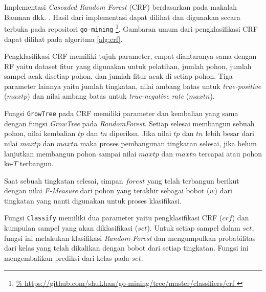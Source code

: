 Implementasi \textit{Cascaded Random Forest} (CRF) berdasarkan pada makalah
Bauman dkk.  \cite{baumann2013cascaded}.
Hasil dari implementasi dapat dilihat dan digunakan secara terbuka pada
repositori \texttt{go-mining}
\footnote{
\url{%
https://github.com/shuLhan/go-mining/tree/master/classifiers/crf
}}.
Gambaran umum dari pengklasifikasi CRF dapat dilihat pada algoritma
\ref{alg:crf}.

Pengklasifikasi CRF memiliki tujuh parameter, empat diantaranya sama dengan RF
yaitu dataset fitur yang digunakan untuk pelatihan, jumlah pohon, jumlah sampel
acak disetiap pohon, dan jumlah fitur acak di setiap pohon.
Tiga parameter lainnya yaitu jumlah tingkatan, nilai ambang batas untuk
\textit{true-positive} ($maxtp$) dan nilai ambang batas untuk
\textit{true-negative rate} ($maxtn$).

	\newpage
	

Fungsi \texttt{GrowTree} pada CRF memiliki parameter dan kembalian yang sama
dengan fungsi \textit{GrowTree} pada \textit{RandomForest}.
Setiap selesai membangun sebuah pohon, nilai kembalian $tp$ dan $tn$ diperiksa.
Jika nilai $tp$ dan $tn$ lebih besar dari nilai $maxtp$ dan $maxtn$ maka proses
pembangunan tingkatan selesai, jika belum lanjutkan membangun pohon sampai
nilai $maxtp$ dan $maxtn$ tercapai atau pohon ke-$T$ terbangun.

Saat sebuah tingkatan selesai, simpan $forest$ yang telah terbangun berikut
dengan nilai \textit{F-Measure} dari pohon yang terakhir sebagai bobot ($w$)
dari tingkatan yang nanti digunakan untuk proses klasifikasi.

Fungsi \texttt{Classify} memiliki dua parameter yaitu pengklasifikasi CRF
($crf$) dan kumpulan sampel yang akan diklasifikasi ($set$).
Untuk setiap sampel dalam $set$, fungsi ini melakukan klasifikasi
\textit{Random-Forest} dan mengumpulkan probabilitas dari kelas yang telah
dikalikan dengan bobot dari setiap tingkatan.
Fungsi ini mengembalikan prediksi dari kelas pada $set$.
